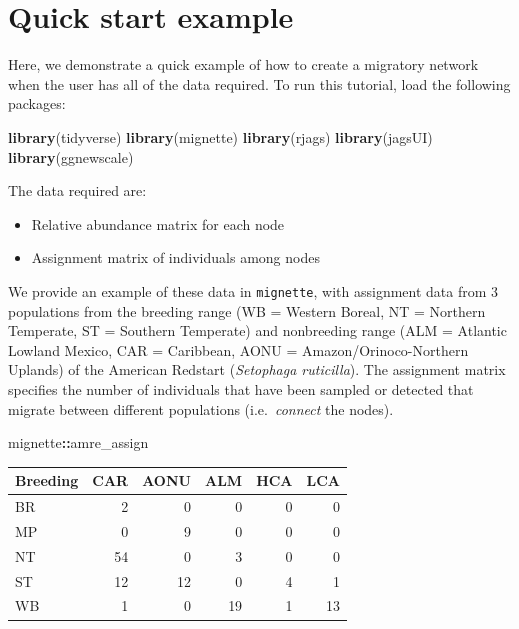 \documentclass[
]{book}
\newenvironment{Shaded}{\begin{snugshade}}{\end{snugshade}}
\newcommand{\FunctionTok}[1]{\textcolor[rgb]{0.13,0.29,0.53}{\textbf{#1}}}
\newcommand{\NormalTok}[1]{#1}
\newcommand{\SpecialCharTok}[1]{\textcolor[rgb]{0.81,0.36,0.00}{\textbf{#1}}}
\providecommand{\tightlist}{%
  \setlength{\itemsep}{0pt}\setlength{\parskip}{0pt}}
\begin{document}
\hypertarget{quickstart}{%
\chapter{Quick start example}\label{quickstart}}

Here, we demonstrate a quick example of how to create a migratory network when the user has all of the data required. To run this tutorial, load the following packages:

\begin{Shaded}
\begin{Highlighting}[]
\FunctionTok{library}\NormalTok{(tidyverse)}
\FunctionTok{library}\NormalTok{(mignette)}
\FunctionTok{library}\NormalTok{(rjags)}
\FunctionTok{library}\NormalTok{(jagsUI)}
\FunctionTok{library}\NormalTok{(ggnewscale)}
\end{Highlighting}
\end{Shaded}

The data required are:

\begin{itemize}
\tightlist
\item
  Relative abundance matrix for each node
\item
  Assignment matrix of individuals among nodes
\end{itemize}

We provide an example of these data in \texttt{mignette}, with assignment data from 3 populations from the breeding range (WB = Western Boreal, NT = Northern Temperate, ST = Southern Temperate) and nonbreeding range (ALM = Atlantic Lowland Mexico, CAR = Caribbean, AONU = Amazon/Orinoco-Northern Uplands) of the American Redstart (\emph{Setophaga ruticilla}). The assignment matrix specifies the number of individuals that have been sampled or detected that migrate between different populations (i.e.~\emph{connect} the nodes).

\begin{Shaded}
\begin{Highlighting}[]
\NormalTok{mignette}\SpecialCharTok{::}\NormalTok{amre\_assign}
\end{Highlighting}
\end{Shaded}

\begin{tabular}{l|r|r|r|r|r}
\hline
Breeding & CAR & AONU & ALM & HCA & LCA\\
\hline
BR & 2 & 0 & 0 & 0 & 0\\
\hline
MP & 0 & 9 & 0 & 0 & 0\\
\hline
NT & 54 & 0 & 3 & 0 & 0\\
\hline
ST & 12 & 12 & 0 & 4 & 1\\
\hline
WB & 1 & 0 & 19 & 1 & 13\\
\hline
\end{tabular}
\end{document}
